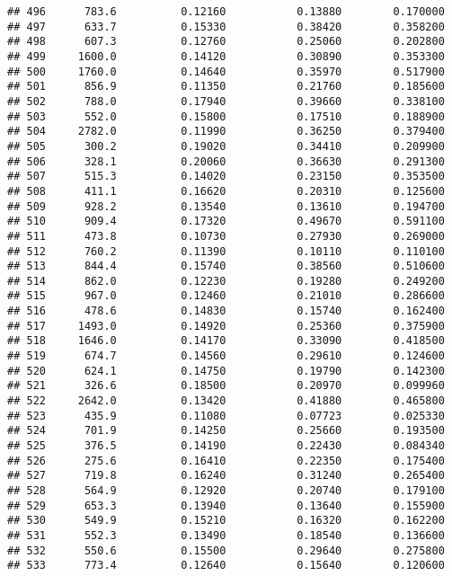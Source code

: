 \documentclass[
]{article}
\begin{document}
\begin{verbatim}
## 496      783.6          0.12160           0.13880        0.170000
## 497      633.7          0.15330           0.38420        0.358200
## 498      607.3          0.12760           0.25060        0.202800
## 499     1600.0          0.14120           0.30890        0.353300
## 500     1760.0          0.14640           0.35970        0.517900
## 501      856.9          0.11350           0.21760        0.185600
## 502      788.0          0.17940           0.39660        0.338100
## 503      552.0          0.15800           0.17510        0.188900
## 504     2782.0          0.11990           0.36250        0.379400
## 505      300.2          0.19020           0.34410        0.209900
## 506      328.1          0.20060           0.36630        0.291300
## 507      515.3          0.14020           0.23150        0.353500
## 508      411.1          0.16620           0.20310        0.125600
## 509      928.2          0.13540           0.13610        0.194700
## 510      909.4          0.17320           0.49670        0.591100
## 511      473.8          0.10730           0.27930        0.269000
## 512      760.2          0.11390           0.10110        0.110100
## 513      844.4          0.15740           0.38560        0.510600
## 514      862.0          0.12230           0.19280        0.249200
## 515      967.0          0.12460           0.21010        0.286600
## 516      478.6          0.14830           0.15740        0.162400
## 517     1493.0          0.14920           0.25360        0.375900
## 518     1646.0          0.14170           0.33090        0.418500
## 519      674.7          0.14560           0.29610        0.124600
## 520      624.1          0.14750           0.19790        0.142300
## 521      326.6          0.18500           0.20970        0.099960
## 522     2642.0          0.13420           0.41880        0.465800
## 523      435.9          0.11080           0.07723        0.025330
## 524      701.9          0.14250           0.25660        0.193500
## 525      376.5          0.14190           0.22430        0.084340
## 526      275.6          0.16410           0.22350        0.175400
## 527      719.8          0.16240           0.31240        0.265400
## 528      564.9          0.12920           0.20740        0.179100
## 529      653.3          0.13940           0.13640        0.155900
## 530      549.9          0.15210           0.16320        0.162200
## 531      552.3          0.13490           0.18540        0.136600
## 532      550.6          0.15500           0.29640        0.275800
## 533      773.4          0.12640           0.15640        0.120600

\end{verbatim}
\end{document}
